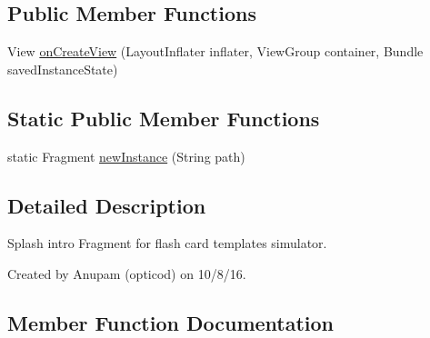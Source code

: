 \subsection*{Public Member Functions}
\begin{DoxyCompactItemize}
\item 
View \hyperlink{classorg_1_1buildmlearn_1_1toolkit_1_1flashcardtemplate_1_1fragment_1_1SplashFragment_ac4d3e360e441e1cb35fc08ff3eed0ae0}{on\+Create\+View} (Layout\+Inflater inflater, View\+Group container, Bundle saved\+Instance\+State)
\end{DoxyCompactItemize}
\subsection*{Static Public Member Functions}
\begin{DoxyCompactItemize}
\item 
static Fragment \hyperlink{classorg_1_1buildmlearn_1_1toolkit_1_1flashcardtemplate_1_1fragment_1_1SplashFragment_ae9c6dd3c121372f1873117a9abbbb37d}{new\+Instance} (String path)
\end{DoxyCompactItemize}


\subsection{Detailed Description}
Splash intro Fragment for flash card template\textquotesingle{}s simulator. 

Created by Anupam (opticod) on 10/8/16. 

\subsection{Member Function Documentation}
